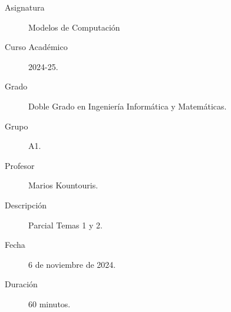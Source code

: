 \documentclass[12pt]{article}
\begin{document}

    
    

    \begin{description}
        \item[Asignatura] Modelos de Computación
        \item[Curso Académico] 2024-25.
        \item[Grado] Doble Grado en Ingeniería Informática y Matemáticas.
        \item[Grupo] A1.
        \item[Profesor] Marios Kountouris.
        \item[Descripción] Parcial Temas 1 y 2.
        \item[Fecha] 6 de noviembre de 2024.
        \item[Duración] 60 minutos.    
    \end{description}
    \newpage
\end{document}
